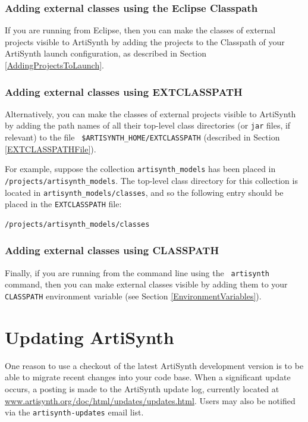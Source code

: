 \documentclass{article}
\def\SEP{/}
\def\TOP{/}
\def\directory{directory }
\def\directories{directories }
\begin{document}
\subsubsection{Adding external classes using the Eclipse Classpath}

If you are running from Eclipse, then you can make the classes of
external projects visible to ArtiSynth by adding the projects to the
{\sf Classpath} of your ArtiSynth launch configuration, as described
in Section \ref{AddingProjectsToLaunch}.

\subsubsection{Adding external classes using EXTCLASSPATH}

Alternatively, you can make the classes of external projects visible
to ArtiSynth by adding the path names of all their top-level class
\directories (or {\tt jar} files, if relevant) to the file {\tt
\$ARTISYNTH\_HOME\SEP EXTCLASSPATH} (described in Section
\ref{EXTCLASSPATHFile}).

For example, suppose the collection {\tt artisynth\_models}
has been placed in {\tt \TOP projects\SEP artisynth\_models}.
The top-level class \directory for this collection is located
in {\tt artisynth\_models\SEP classes}, and so the following entry
should be placed in the {\tt EXTCLASSPATH} file:

\begin{verbatim}
/projects/artisynth_models/classes
\end{verbatim}

\subsubsection{Adding external classes using CLASSPATH}

Finally, if you are running from the command line using the {\tt
artisynth} command, then you can make external classes visible by adding
them to your {\tt CLASSPATH} environment variable (see Section
\ref{EnvironmentVariables}).

\section{Updating ArtiSynth}
\label{UpdatingArtiSynth}

One reason to use a checkout of the latest ArtiSynth
development version is to be able to migrate recent changes into your
code base. When a significant update occurs, a posting is made to the
ArtiSynth update log, currently located at
\href{http://www.artisynth.org/doc/html/updates/updates.html}
{www.artisynth.org/doc/html/updates/updates.html}.
Users may also be notified via the {\tt artisynth-updates} email list.
\end{document}
